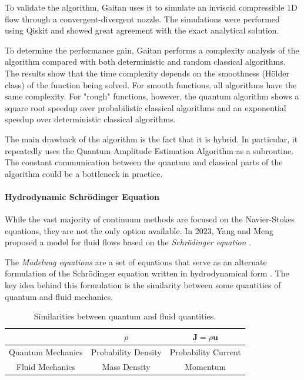 To validate the algorithm, Gaitan uses it to simulate an inviscid compressible 1D flow through a convergent-divergent nozzle.
The simulations were performed using Qiskit \cite{qiskit2024} and showed great agreement with the exact analytical solution.

To determine the performance gain, Gaitan performs a complexity analysis of the algorithm compared with both deterministic and random classical algorithms.
The results show that the time complexity depends on the smoothness (Hölder class) of the function being solved. For smooth functions, all algorithms have the same complexity.
For "rough" functions, however, the quantum algorithm shows a square root speedup over probabilistic classical algorithms and an exponential speedup over deterministic classical algorithms.

The main drawback of the algorithm is the fact that it is hybrid. In particular, it repeatedly uses the Quantum Amplitude Estimation Algorithm as a subroutine. The constant communication between the quantum and classical parts of the algorithm could be a bottleneck in practice.

\paragraph*{Hydrodynamic Schrödinger Equation}
While the vast majority of continuum methods are focused on the Navier-Stokes equations, they are not the only option available.
In 2023, Yang and Meng proposed a model for fluid flows based on the \emph{Schrödinger equation} \cite{meng2023quantum}.

The \emph{Madelung equations} are a set of equations that serve as an alternate formulation of the Schrödinger equation written in hydrodynamical form \cite{schonberg1954hydrodynamical}.
The key idea behind this formulation is the similarity between some quantities of quantum and fluid mechanics.
\begin{table}[ht!]
    \caption{Similarities between quantum and fluid quantities.}
    \label{tab:quantities}
    \centering
    \begin{tabular}{|c|c|c|}
    \hline
    & $\rho$ & $\pmb{J}=\rho \pmb{u}$ \\
    \hline
    Quantum Mechanics & Probability Density & Probability Current \\
    \hline
    Fluid Mechanics & Mass Density & Momentum \\
    \hline
    \end{tabular}
\end{table}

